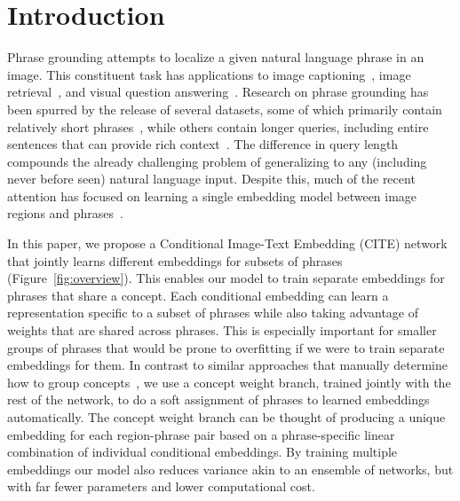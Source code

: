 \documentclass[runningheads]{llncs}
\makeatletter
\DeclareRobustCommand\onedot{\futurelet\@let@token\@onedot}
\def\@onedot{\ifx\@let@token.\else.\null\fi\xspace}
\def\ie{\emph{i.e}\onedot} \def\Ie{\emph{I.e}\onedot}
\makeatother
\begin{document}
\section{Introduction}
Phrase grounding attempts to localize a given natural language phrase in an image.  This constituent task has applications to image captioning~\cite{fang2014captions,densecap2015,karpathy2014deep,liuAAAI2017,xu2015show}, image retrieval~\cite{gordoECCV2016,RadenovicECCV2016}, and visual question answering~\cite{AntolICCV2015,tommasiBMVC2016,fukui16emnlp}.  Research on phrase grounding has been spurred by the release of several datasets, some of which primarily contain relatively short phrases~\cite{kazemzadeh-EtAl:2014:EMNLP2014,krishnavisualgenome}, while others contain longer queries, including entire sentences that can provide rich context~\cite{flickrentitiesijcv,mao2016generation}.  The difference in query length compounds the already challenging problem of generalizing to any (including never before seen) natural language input. Despite this, much of the recent attention has focused on learning a single embedding model between image regions and phrases~\cite{fukui16emnlp,mao2016generation,hu2015natural,rohrbach2015,wang2016CVPR,wangTwoBranch2017,yehNIPS2017,Luo_2017_CVPR}.

In this paper, we propose a Conditional Image-Text Embedding (CITE) network that jointly learns different embeddings for subsets of phrases (Figure~\ref{fig:overview}).  This enables our model to train separate embeddings for phrases that share a concept.  %
Each conditional embedding can learn a representation specific to a subset of phrases while also taking advantage of weights that are shared across phrases.  This is especially important for smaller groups of phrases that would be prone to overfitting if we were to train separate embeddings for them.  In contrast to similar approaches that manually determine how to group concepts~\cite{Liu_2017_ICCV,plummerPLCLC2017,veitCVPR2017}, we use a concept weight branch, trained jointly with the rest of the network, to do a soft assignment of phrases to learned embeddings automatically.   
The concept weight branch can be thought of producing a unique embedding for each region-phrase pair based on a phrase-specific linear combination of individual conditional embeddings. 
 By training multiple embeddings our model also reduces variance akin to an ensemble of networks, but with far fewer parameters and lower computational cost.  
\end{document}
